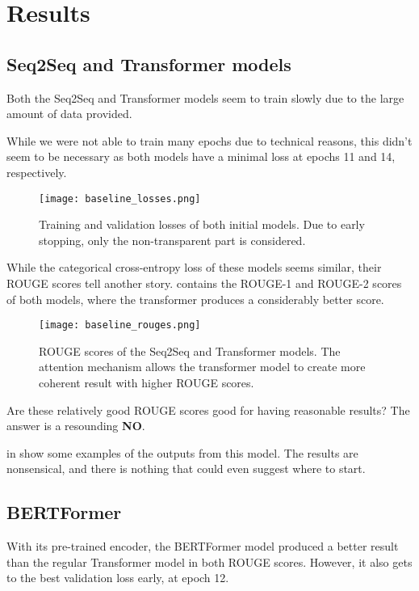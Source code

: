 \section{Results}

\subsection{Seq2Seq and Transformer models}
Both the Seq2Seq and Transformer models seem to train slowly due to the large amount of data provided.

While we were not able to train many epochs due to technical reasons, this didn't seem to be necessary as both models have a minimal loss at epochs 11 and 14, respectively.

\begin{figure}[h]
	\texttt{[image: baseline\_losses.png]}
	\caption{Training and validation losses of both initial models. Due to early stopping, only the non-transparent part is considered.}
\end{figure}

While the categorical cross-entropy loss of these models seems similar, their ROUGE scores tell another story.
 contains the ROUGE-1 and ROUGE-2 scores of both models, where the transformer produces a considerably better score.

\begin{figure}[h]
	\texttt{[image: baseline\_rouges.png]}
	\caption{ROUGE scores of the Seq2Seq and Transformer models. The attention mechanism allows the transformer model to create more coherent result with higher ROUGE scores.}
	\label{baseline_rouges}
\end{figure}

Are these relatively good ROUGE scores good for having reasonable results?
The answer is a resounding \textbf{NO}.

 in \appendixA show some examples of the outputs from this model.
The results are nonsensical, and there is nothing that could even suggest where to start.

\subsection{BERTFormer}

With its pre-trained encoder, the BERTFormer model produced a better result than the regular Transformer model in both ROUGE scores.
However, it also gets to the best validation loss early, at epoch 12.

